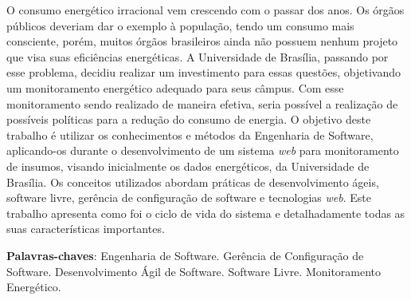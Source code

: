 \begin{resumo}
O consumo energético irracional vem crescendo com o passar dos anos. Os órgãos públicos deveriam dar o exemplo à população, tendo um consumo mais consciente, porém, muitos órgãos brasileiros ainda não possuem nenhum projeto que visa suas eficiências energéticas. A Universidade de Brasília, passando por esse problema, decidiu realizar um investimento para essas questões, objetivando um monitoramento energético adequado para seus câmpus. Com esse monitoramento sendo realizado de maneira efetiva, seria possível a realização de possíveis políticas para a redução do consumo de energia. O objetivo deste trabalho é utilizar os conhecimentos e métodos da Engenharia de Software, aplicando-os durante o desenvolvimento de um sistema \textit{web} para monitoramento de insumos, visando inicialmente os dados energéticos, da Universidade de Brasília. Os conceitos utilizados abordam práticas de desenvolvimento ágeis, software livre, gerência de configuração de software e tecnologias \textit{web}. Este trabalho apresenta como foi o ciclo de vida do sistema e detalhadamente todas as suas características importantes.

 \vspace{\onelineskip}

 \noindent
 \textbf{Palavras-chaves}: Engenharia de Software. Gerência de Configuração de Software. Desenvolvimento Ágil de Software. Software Livre. Monitoramento Energético.
\end{resumo}